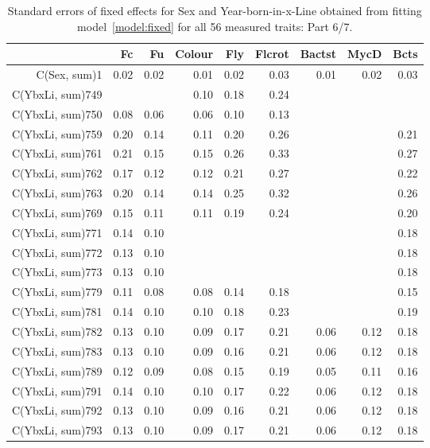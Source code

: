 \begin{table}[p]
\centering
\caption{Standard errors of fixed effects for Sex and Year-born-in-x-Line obtained from fitting model~\ref{model:fixed} for all 56 measured traits: Part 6/7.}
\label{tab:seb6}
\begin{tabular}{rrrrrrrrr}
  \hline
 & Fc & Fu & Colour & Fly & Flcrot & Bactst & MycD & Bcts \\ 
  \hline
C(Sex, sum)1 & 0.02 & 0.02 & 0.01 & 0.02 & 0.03 & 0.01 & 0.02 & 0.03 \\ 
  C(YbxLi, sum)749 &  &  & 0.10 & 0.18 & 0.24 &  &  &  \\ 
  C(YbxLi, sum)750 & 0.08 & 0.06 & 0.06 & 0.10 & 0.13 &  &  &  \\ 
  C(YbxLi, sum)759 & 0.20 & 0.14 & 0.11 & 0.20 & 0.26 &  &  & 0.21 \\ 
  C(YbxLi, sum)761 & 0.21 & 0.15 & 0.15 & 0.26 & 0.33 &  &  & 0.27 \\ 
  C(YbxLi, sum)762 & 0.17 & 0.12 & 0.12 & 0.21 & 0.27 &  &  & 0.22 \\ 
  C(YbxLi, sum)763 & 0.20 & 0.14 & 0.14 & 0.25 & 0.32 &  &  & 0.26 \\ 
  C(YbxLi, sum)769 & 0.15 & 0.11 & 0.11 & 0.19 & 0.24 &  &  & 0.20 \\ 
  C(YbxLi, sum)771 & 0.14 & 0.10 &  &  &  &  &  & 0.18 \\ 
  C(YbxLi, sum)772 & 0.13 & 0.10 &  &  &  &  &  & 0.18 \\ 
  C(YbxLi, sum)773 & 0.13 & 0.10 &  &  &  &  &  & 0.18 \\ 
  C(YbxLi, sum)779 & 0.11 & 0.08 & 0.08 & 0.14 & 0.18 &  &  & 0.15 \\ 
  C(YbxLi, sum)781 & 0.14 & 0.10 & 0.10 & 0.18 & 0.23 &  &  & 0.19 \\ 
  C(YbxLi, sum)782 & 0.13 & 0.10 & 0.09 & 0.17 & 0.21 & 0.06 & 0.12 & 0.18 \\ 
  C(YbxLi, sum)783 & 0.13 & 0.10 & 0.09 & 0.16 & 0.21 & 0.06 & 0.12 & 0.18 \\ 
  C(YbxLi, sum)789 & 0.12 & 0.09 & 0.08 & 0.15 & 0.19 & 0.05 & 0.11 & 0.16 \\ 
  C(YbxLi, sum)791 & 0.14 & 0.10 & 0.10 & 0.17 & 0.22 & 0.06 & 0.12 & 0.18 \\ 
  C(YbxLi, sum)792 & 0.13 & 0.10 & 0.09 & 0.16 & 0.21 & 0.06 & 0.12 & 0.18 \\ 
  C(YbxLi, sum)793 & 0.13 & 0.10 & 0.09 & 0.17 & 0.21 & 0.06 & 0.12 & 0.18 \\ 

\end{tabular}
\end{table}
